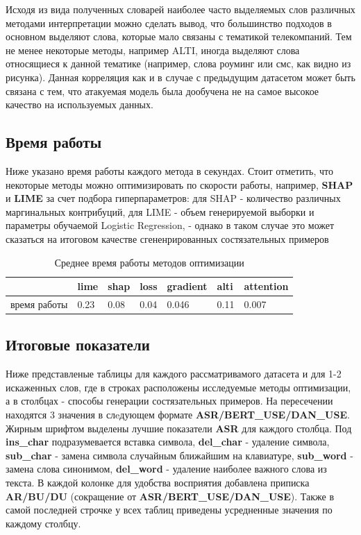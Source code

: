 \noindent\hspace{0.6cm}Исходя из вида полученных словарей наиболее часто выделяемых слов различных методами интерпретации можно сделать вывод, что большинство подходов в основном выделяют слова, которые мало связаны с тематикой телекомпаний. Тем не менее некоторые методы, например ALTI, иногда выделяют слова относящиеся к данной тематике (например, слова роуминг или смс, как видно из рисунка). Данная корреляция как и в случае с предыдущим датасетом может быть связана с тем, что атакуемая модель была дообучена не на самое высокое качество на используемых данных.

\newpage
\subsection{Время работы}

\noindent\hspace{0.6cm}Ниже указано время работы каждого метода в секундах. Стоит отметить, что некоторые методы можно оптимизировать по скорости работы, например, \textbf{SHAP} и \textbf{LIME} за счет подбора гиперпараметров: для SHAP - количество различных маргинальных контрибуций, для LIME - объем генерируемой выборки и параметры обучаемой Logistic Regression, - однако в таком случае это может сказаться на итоговом качестве сгененрированных состязательных примеров

\begin{table}[h]
  \centering
  {\renewcommand{\arraystretch}{1.5}
  \caption{Среднее время работы методов оптимизации}
  {\fontsize{11pt}{10pt}\selectfont
  \begin{tabularx}{\textwidth}{|l|X|X|X|X|X|X|}
    \hline
     & lime         & shap         & loss         & gradient         & alti      & attention  \\
    \hline
     время работы      & 0.23 & 0.08 & 0.04 & 0.046 & 0.11 & 0.007\\
    \hline
    \end{tabularx}
    }
    }
\end{table}

\subsection{Итоговые показатели}

\noindent\hspace{0.6cm}Ниже представленые таблицы для каждого рассматривамого датасета и для 1-2 искаженных слов, где в строках расположены исследуемые методы оптимизации, а в столбцах - способы генерации состязательных примеров. На пересечении находятся 3 значения в слeдующем формате \textbf{ASR/BERT\_USE/DAN\_USE}. Жирным шрифтом выделены лучшие показатели \textbf{ASR} для каждого столбца. Под \textbf{ins\_char} подразумевается вставка символа, \textbf{del\_char} - удаление символа, \textbf{sub\_char} - замена символа случайным ближайшим на клавиатуре, \textbf{sub\_word} - замена слова синонимом, \textbf{del\_word} - удаление наиболее важного слова из текста. В каждой колонке для удобства восприятия добавлена приписка \textbf{AR/BU/DU} (сокращение от \textbf{ASR/BERT\_USE/DAN\_USE}). Также в самой последней строчке у всех таблиц приведены усредненные значения по каждому столбцу.

